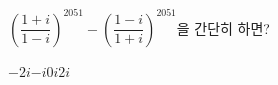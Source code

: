 $\left(\dfrac{1+i}{1-i}\right)^{2051}-\left(\dfrac{1-i}{1+i}\right)^{2051}$을 간단히 하면?
\begin{choices32}{$-2i$}{$-i$}{$0$}{$i$}{$2i$}\end{choices32}
